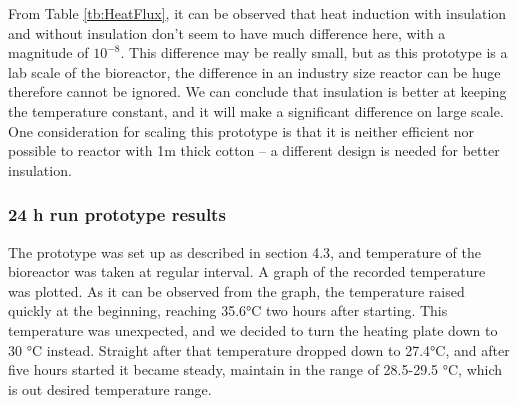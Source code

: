 From Table \ref{tb:HeatFlux}, it can be observed that heat induction with insulation and without insulation don't seem to have much difference here, with a magnitude of $10^{-8}$. This difference may be really small, but as this prototype is a lab scale of the bioreactor, the difference in an industry size reactor can be huge therefore cannot be ignored. We can conclude that insulation is better at keeping the temperature constant, and it will make a significant difference on large scale. One consideration for scaling this prototype is that it is neither efficient nor possible to reactor with 1m thick cotton -- a different design is needed for better insulation.

\subsubsection{24 h run prototype results}
\begin{figure}[h]
    \centering
\end{figure}

The prototype was set up as described in section 4.3, and temperature of the bioreactor was taken at regular interval. A graph of the recorded temperature was plotted. As it can be observed from the graph, the temperature raised quickly at the beginning, reaching 35.6\si{\celsius} two hours after starting. This temperature was unexpected, and we decided to turn the heating plate down to 30 \si{\celsius} instead. Straight after that temperature dropped down to 27.4\si{\celsius}, and after five hours started it became steady, maintain in the range of 28.5-29.5 \si{\celsius}, which is out desired temperature range. 

